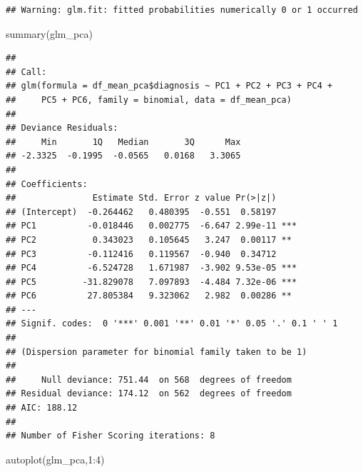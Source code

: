\documentclass[
  11pt,
]{article}
\newenvironment{Shaded}{\begin{snugshade}}{\end{snugshade}}
\newcommand{\AttributeTok}[1]{\textcolor[rgb]{0.77,0.63,0.00}{#1}}
\newcommand{\DecValTok}[1]{\textcolor[rgb]{0.00,0.00,0.81}{#1}}
\newcommand{\FunctionTok}[1]{\textcolor[rgb]{0.00,0.00,0.00}{#1}}
\newcommand{\NormalTok}[1]{#1}
\newcommand{\OtherTok}[1]{\textcolor[rgb]{0.56,0.35,0.01}{#1}}
\newcommand{\SpecialCharTok}[1]{\textcolor[rgb]{0.00,0.00,0.00}{#1}}
\begin{document}
\begin{Shaded}
\end{Shaded}

\begin{verbatim}
## Warning: glm.fit: fitted probabilities numerically 0 or 1 occurred
\end{verbatim}

\begin{Shaded}
\begin{Highlighting}[]
\FunctionTok{summary}\NormalTok{(glm\_pca)}
\end{Highlighting}
\end{Shaded}

\begin{verbatim}
## 
## Call:
## glm(formula = df_mean_pca$diagnosis ~ PC1 + PC2 + PC3 + PC4 + 
##     PC5 + PC6, family = binomial, data = df_mean_pca)
## 
## Deviance Residuals: 
##     Min       1Q   Median       3Q      Max  
## -2.3325  -0.1995  -0.0565   0.0168   3.3065  
## 
## Coefficients:
##               Estimate Std. Error z value Pr(>|z|)    
## (Intercept)  -0.264462   0.480395  -0.551  0.58197    
## PC1          -0.018446   0.002775  -6.647 2.99e-11 ***
## PC2           0.343023   0.105645   3.247  0.00117 ** 
## PC3          -0.112416   0.119567  -0.940  0.34712    
## PC4          -6.524728   1.671987  -3.902 9.53e-05 ***
## PC5         -31.829078   7.097893  -4.484 7.32e-06 ***
## PC6          27.805384   9.323062   2.982  0.00286 ** 
## ---
## Signif. codes:  0 '***' 0.001 '**' 0.01 '*' 0.05 '.' 0.1 ' ' 1
## 
## (Dispersion parameter for binomial family taken to be 1)
## 
##     Null deviance: 751.44  on 568  degrees of freedom
## Residual deviance: 174.12  on 562  degrees of freedom
## AIC: 188.12
## 
## Number of Fisher Scoring iterations: 8
\end{verbatim}

\begin{Shaded}
\begin{Highlighting}[]
\FunctionTok{autoplot}\NormalTok{(glm\_pca,}\DecValTok{1}\SpecialCharTok{:}\DecValTok{4}\NormalTok{)}
\end{Highlighting}
\end{Shaded}
\end{document}
